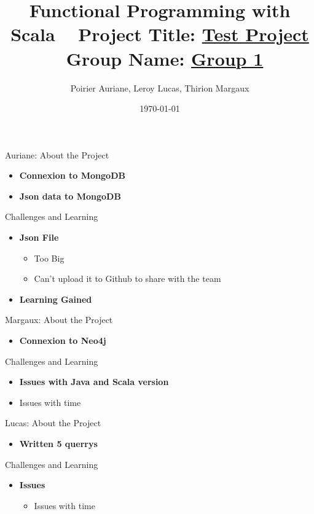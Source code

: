 \documentclass[serif, aspectratio=169]{beamer}
\title[Project Presentation]{Functional Programming with Scala \ { \large Project Title: \underline{ Test Project \hspace{2cm}}}\ {\small Group Name: \underline{ Group 1 \hspace{2cm} }}}
\author{Poirier Auriane, Leroy Lucas, Thirion Margaux}
\institute{ IG5_Polytech}
\date{\small \today}
\begin{document}
\begin{frame}
    \titlepage
\end{frame}

\begin{frame}{Auriane: About the Project}
    \begin{itemize}
        \item \textbf{Connexion to MongoDB}
        \medskip
        \item \textbf{Json data to MongoDB}

    \end{itemize}
\end{frame}

\begin{frame}{Challenges and Learning}
    \begin{itemize}
        \item \textbf{Json File}
        \begin{itemize}
            \item Too Big
            \item Can't upload it to Github to share with the team
        \end{itemize}
        \medskip
        \item \textbf{Learning Gained}
    \end{itemize}
\end{frame}


\begin{frame}{Margaux: About the Project}
    \begin{itemize}
        \item \textbf{Connexion to Neo4j}
    \end{itemize}
\end{frame}

\begin{frame}{Challenges and Learning}
    \begin{itemize}
        \item \textbf{Issues with Java and Scala version}
            \item Issues with time
    \end{itemize}
\end{frame}




\begin{frame}{Lucas: About the Project}
    \begin{itemize}
        \item \textbf{Written 5 querrys}
        \medskip
    \end{itemize}
\end{frame}

\begin{frame}{Challenges and Learning}
    \begin{itemize}
        \item \textbf{Issues}
        \begin{itemize}
            \item Issues with time
        \end{itemize}
    \end{itemize}
\end{frame}
\end{document}
